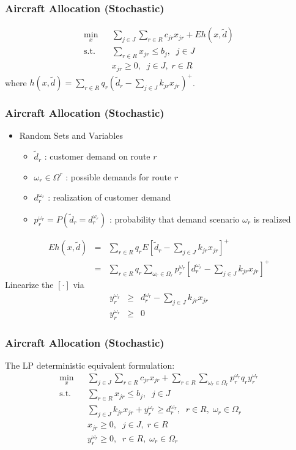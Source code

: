\documentclass[12pt,handout]{beamer}
\begin{document}
\begin{frame}
\frametitle{Aircraft Allocation (Stochastic)}
\begin{eqnarray}
\min_x && \sum_{j \in J} \sum_{r \in R} c_{jr} x_{jr} + Eh(x, \tilde{d}) \nonumber \\
\mbox{s.t.} && \sum_{r \in R} x_{jr} \le b_j,\;\;j \in J \nonumber \\
&& x_{jr} \ge 0,\;\;j \in J,\;r \in R \nonumber
\end{eqnarray}
where $h(x, \tilde{d}) = \sum_{r \in R} q_r (\tilde{d}_r - \sum_{j \in J} k_{jr} x_{jr})^+$.
\end{frame}

\begin{frame}
\frametitle{Aircraft Allocation (Stochastic)}
\begin{itemize}
\item Random Sets and Variables
    \begin{itemize}
    \item $\tilde{d}_r$ : customer demand on route $r$
    \item $\omega_r \in \Omega^r$ : possible demands for route $r$
    \item $d_r^{\omega_r}$ : realization of customer demand
    \item $p_r^{\omega_r} = P(\tilde{d}_r = d_r^{\omega_r})$ : probability that demand scenario $\omega_r$ is realized
    \end{itemize}
\end{itemize}
\begin{eqnarray}
Eh(x, \tilde{d}) &=& \sum_{r \in R} q_r E[\tilde{d}_r - \sum_{j \in J} k_{jr} x_{jr}]^+ \nonumber \\
&=& \sum_{r \in R} q_r \sum_{\omega_r \in \Omega_r} p_r^{\omega_r} [d_r^{\omega_r} - \sum_{j \in J} k_{jr} x_{jr}]^+ \nonumber
\end{eqnarray}
Linearize the $[\cdot]$ via
\begin{eqnarray}
y_r^{\omega_r} &\ge& d_r^{\omega_r} - \sum_{j \in J} k_{jr} x_{jr} \nonumber \\
y_r^{\omega_r} &\ge& 0 \nonumber
\end{eqnarray}
\end{frame}

\begin{frame}
\frametitle{Aircraft Allocation (Stochastic)}
The LP deterministic equivalent formulation:
\begin{eqnarray}
\min_x && \sum_{j \in J} \sum_{r \in R} c_{jr} x_{jr} + \sum_{r \in R} \sum_{\omega_r \in \Omega_r} p_r^{\omega_r} q_r y_r^{\omega_r} \nonumber \\
\mbox{s.t.} && \sum_{r \in R} x_{jr} \le b_j,\;\;j \in J \nonumber \\
&& \sum_{j \in J} k_{jr} x_{jr} + y_r^{\omega_r} \ge d_r^{\omega_r},\;\;r \in R,\;\omega_r \in \Omega_r \nonumber \\
&& x_{jr} \ge 0, \;\;j \in J,\;r \in R \nonumber \\
&& y_r^{\omega_r} \ge 0,\;\;r \in R,\;\omega_r \in \Omega_r \nonumber
\end{eqnarray}
\end{frame}
\end{document}
